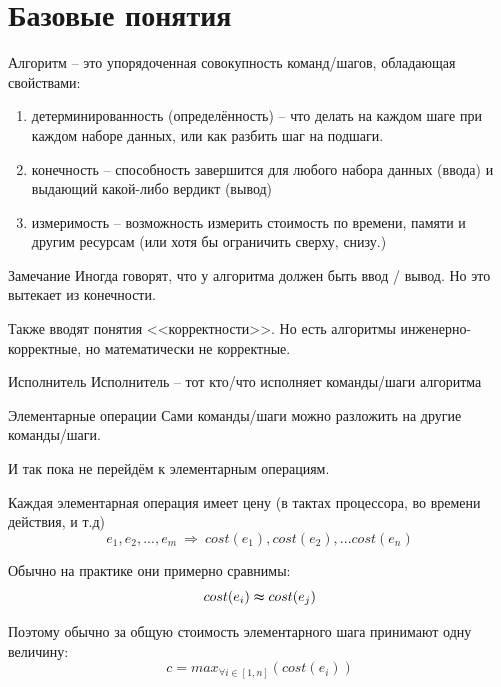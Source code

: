 \section{Базовые понятия}\label{section:base_alg}

\begin{frame}{Алгоритм}
	\footnotesize
{} -- это упорядоченная совокупность команд/шагов,
обладающая свойствами:
\begin{enumerate}
	\item детерминированность (определённость) -- что делать на каждом шаге при каждом наборе данных, или как разбить шаг на подшаги.
	\item конечность -- способность завершится для любого набора данных (ввода) и выдающий какой-либо вердикт (вывод)
	\item измеримость -- возможность измерить стоимость по времени, памяти и другим ресурсам (или хотя бы ограничить сверху, снизу.)
\end{enumerate}

\begin{block}{Замечание}
	Иногда говорят, что у алгоритма должен быть ввод / вывод. Но это вытекает из конечности.
	
	Также вводят понятия <<корректности>>. Но есть алгоритмы инженерно-корректные, но математически не корректные.
\end{block}

\end{frame}


\begin{frame}{Исполнитель}
	Исполнитель -- тот кто/что исполняет команды/шаги алгоритма
	
	
\end{frame}


\begin{frame}{Элементарные операции}
	Сами команды/шаги можно разложить на другие команды/шаги.
	
	И так пока не перейдём к элементарным операциям.
	
	Каждая элементарная операция имеет цену (в тактах процессора, во времени действия, и т.д)
	\begin{equation}
	e_1, e_2, ..., e_m ~\Longrightarrow~ cost(e_1), cost(e_2), ... cost(e_n) 
	\end{equation}
	
	Обычно на практике они примерно сравнимы:
	\begin{equation}
	cost (e_i) \thickapprox cost (e_j)
	\end{equation}
	
	Поэтому обычно за общую стоимость элементарного шага принимают одну величину:
	\begin{equation}
	c = max_{\forall i \in [1, n]} (cost(e_i))
	\end{equation}
	
\end{frame}

